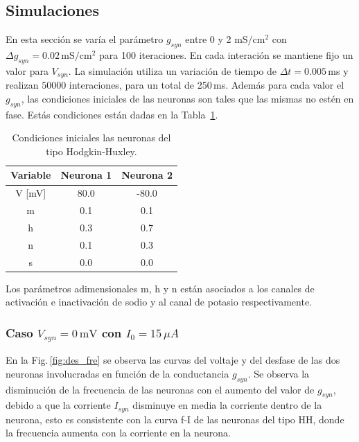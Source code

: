 \subsection{Simulaciones}

En esta sección se varía el parámetro $g_{syn}$ entre $0$ y 2 ${\text{mS}}/{\text{cm}^2}$ con $\Delta g_{syn}=0.02\,{\text{mS}}/{\text{cm}^2}$ para 100 iteraciones. En cada interación se mantiene fijo un valor para $V_{syn}$. La simulación utiliza un variación de tiempo de $\Delta t =  0.005\,$ms y realizan $50000$ interaciones, para un total de 250\,ms. Además para cada valor el $g_{syn}$, las condiciones iniciales de las neuronas son tales que las mismas no estén en fase. Estás condiciones están dadas en la Tabla~\ref{tab:ini}. 
    \begin{table}[H]
    \centering
    \begin{tabular}{c| c| c}
    {\bf Variable }& {\bf Neurona 1} & { \bf Neurona 2} \\ \hline
        V [mV]     & 80.0            & -80.0               \\  \hline
        m          & 0.1             & 0.1              \\  \hline
        h          & 0.3             & 0.7               \\  \hline
        n          & 0.1             & 0.3               \\  \hline
        s          & 0.0             & 0.0               \\      
    \end{tabular}
    \caption{Condiciones iniciales las neuronas del tipo Hodgkin-Huxley.}   
         \label{tab:ini}
    \end{table}
Los parámetros adimensionales m, h y n están asociados a los canales de activación e  inactivación de sodio y al canal de potasio respectivamente.

   \subsubsection{Caso \texorpdfstring{$V_{syn}= 0\,\text{mV}$}{}   con  \texorpdfstring{$I_0 = 15\,\mu A$}{}}

    En la Fig.\,\ref{fig:des_fre} se observa las curvas del voltaje y del desfase de las dos neuronas involucradas en función de la conductancia $g_{syn}$. Se observa la disminución de la frecuencia de las neuronas con el aumento del valor de $g_{syn}$, debido a que la corriente $I_{syn}$ disminuye en media la corriente dentro de la neurona, esto es consistente con la curva f-I de las neuronas del tipo HH, donde la frecuencia aumenta con la corriente en la neurona.  

